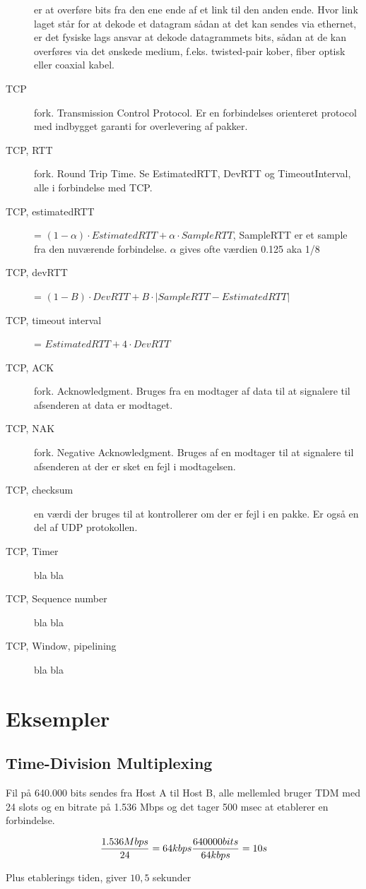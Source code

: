 \documentclass[10pt]{article}
\begin{document}
\begin{description}
    er at overføre bits fra den ene ende af et link til den anden ende. Hvor
    link laget står for at dekode et datagram sådan at det kan sendes via
    ethernet, er det fysiske lags ansvar at dekode datagrammets bits, sådan at
    de kan overføres via det ønskede medium, f.eks. twisted-pair kober, fiber
    optisk eller coaxial kabel.
\item[TCP] fork. Transmission Control Protocol. Er en forbindelses orienteret
    protocol med indbygget garanti for overlevering af pakker.
\item[TCP, RTT] fork. Round Trip Time. Se EstimatedRTT, DevRTT og TimeoutInterval,
    alle i forbindelse med TCP.
\item[TCP, estimatedRTT] = $(1-\alpha) \cdot EstimatedRTT + \alpha \cdot SampleRTT$,
    SampleRTT er et sample fra den nuværende forbindelse. $\alpha$ gives ofte
    værdien 0.125 aka 1/8
\item[TCP, devRTT] = $(1-B) \cdot DevRTT + B \cdot | SampleRTT - EstimatedRTT |$
\item[TCP, timeout interval] = $EstimatedRTT + 4 \cdot DevRTT$
\item[TCP, ACK] fork. Acknowledgment. Bruges fra en modtager af data til at
    signalere til afsenderen at data er modtaget.
\item[TCP, NAK] fork. Negative Acknowledgment. Bruges af en modtager til at
    signalere til afsenderen at der er sket en fejl i modtagelsen.
\item[TCP, checksum] en værdi der bruges til at kontrollerer om der er fejl i en
    pakke. Er også en del af UDP protokollen.
\item[TCP, Timer] bla bla
\item[TCP, Sequence number] bla bla
\item[TCP, Window, pipelining] bla bla

\end{description}

\section{Eksempler}

\subsection{Time-Division Multiplexing}
Fil på 640.000 bits sendes fra Host A til Host B, alle mellemled bruger TDM med
24 slots og en bitrate på 1.536 Mbps og det tager 500 msec at etablerer en
forbindelse.

\[
\frac{1.536 Mbps}{24} = 64 kbps \\
\frac{640000 bits}{64 kbps} = 10 s
\]

Plus etablerings tiden, giver $10,5$ sekunder
\end{document}
